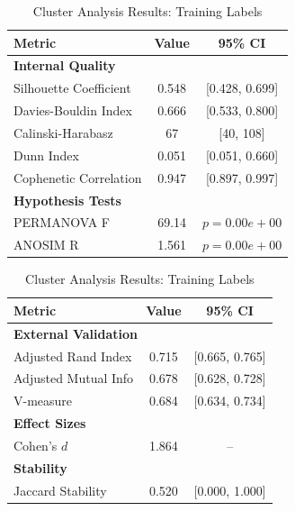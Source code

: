\begin{table}[h!]
\centering
\caption{Cluster Analysis Results: Training Labels}
\label{tab:cluster_training}

\begin{minipage}[t]{0.49\textwidth}
\centering
\begin{tabular}{lcc}
\toprule
Metric & Value & 95\% CI \\
\midrule
\multicolumn{3}{l}{\textbf{Internal Quality}} \\
Silhouette Coefficient & 0.548 & [0.428, 0.699] \\
Davies-Bouldin Index & 0.666 & [0.533, 0.800] \\
Calinski-Harabasz & 67 & [40, 108] \\
Dunn Index & 0.051 & [0.051, 0.660] \\
Cophenetic Correlation & 0.947 & [0.897, 0.997] \\
\midrule
\multicolumn{3}{l}{\textbf{Hypothesis Tests}} \\
PERMANOVA F & 69.14 & $p = 0.00e+00$ \\
ANOSIM R & 1.561 & $p = 0.00e+00$ \\
\bottomrule
\end{tabular}
\end{minipage}\hfill
\begin{minipage}[t]{0.49\textwidth}
\centering
\begin{tabular}{lcc}
\toprule
Metric & Value & 95\% CI \\
\midrule
\multicolumn{3}{l}{\textbf{External Validation}} \\
Adjusted Rand Index & 0.715 & [0.665, 0.765] \\
Adjusted Mutual Info & 0.678 & [0.628, 0.728] \\
V-measure & 0.684 & [0.634, 0.734] \\
\midrule
\multicolumn{3}{l}{\textbf{Effect Sizes}} \\
Cohen's $d$ & 1.864 & -- \\
\midrule
\multicolumn{3}{l}{\textbf{Stability}} \\
Jaccard Stability & 0.520 & [0.000, 1.000] \\
\bottomrule
\end{tabular}
\end{minipage}

\end{table}